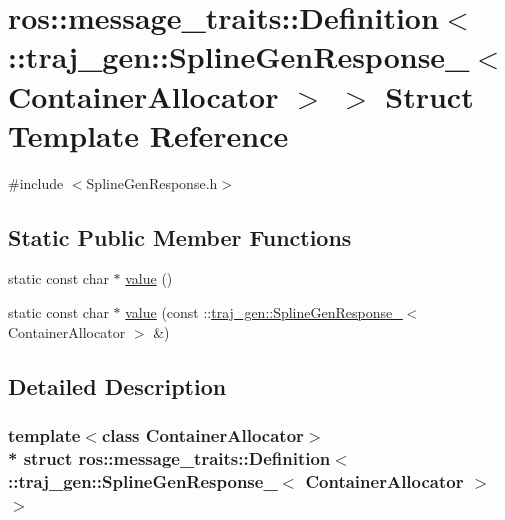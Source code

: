\hypertarget{structros_1_1message__traits_1_1_definition_3_01_1_1traj__gen_1_1_spline_gen_response___3_01_container_allocator_01_4_01_4}{}\section{ros\+:\+:message\+\_\+traits\+:\+:Definition$<$ \+:\+:traj\+\_\+gen\+:\+:Spline\+Gen\+Response\+\_\+$<$ Container\+Allocator $>$ $>$ Struct Template Reference}
\label{structros_1_1message__traits_1_1_definition_3_01_1_1traj__gen_1_1_spline_gen_response___3_01_container_allocator_01_4_01_4}


{\ttfamily \#include $<$Spline\+Gen\+Response.\+h$>$}

\subsection*{Static Public Member Functions}
\begin{DoxyCompactItemize}
\item 
static const char $\ast$ \hyperlink{structros_1_1message__traits_1_1_definition_3_01_1_1traj__gen_1_1_spline_gen_response___3_01_container_allocator_01_4_01_4_ac32fbb755c72ac9ec7185d4cca0bb481}{value} ()
\item 
static const char $\ast$ \hyperlink{structros_1_1message__traits_1_1_definition_3_01_1_1traj__gen_1_1_spline_gen_response___3_01_container_allocator_01_4_01_4_ae196e8f9afb8a1e90b1a408ecd8aca34}{value} (const \+::\hyperlink{structtraj__gen_1_1_spline_gen_response__}{traj\+\_\+gen\+::\+Spline\+Gen\+Response\+\_\+}$<$ Container\+Allocator $>$ \&)
\end{DoxyCompactItemize}


\subsection{Detailed Description}
\subsubsection*{template$<$class Container\+Allocator$>$\\*
struct ros\+::message\+\_\+traits\+::\+Definition$<$ \+::traj\+\_\+gen\+::\+Spline\+Gen\+Response\+\_\+$<$ Container\+Allocator $>$ $>$}



